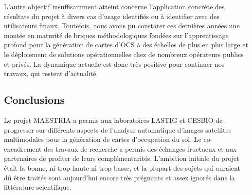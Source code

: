 L’autre objectif insuffisamment atteint concerne l’application concrète des résultats du projet à divers cas d’usage identifiés ou à identifier avec des utilisateurs finaux. Toutefois, nous avons pu constater ces dernières années une montée en maturité de briques méthodologiques fondées sur l'apprentissage profond pour la génération de cartes d'OCS à des échelles de plus en plus large et le déploiement de solutions opérationnelles chez de nombreux opérateurs publics et privés. La dynamique actuelle est donc très positive pour continuer nos travaux, qui restent d'actualité.

\subsection{Conclusions}
Le projet MAESTRIA a permis aux laboratoires LASTIG et CESBIO de progresser sur différents aspects de l'analyse automatique d'images satellites multimodales pour la génération de cartes d'occupation du sol. Le co-encadrement des travaux de recherche a permis des échanges fructueux et aux partenaires de profiter de leurs complémentarités. L'ambition initiale du projet était la bonne, ni trop haute ni trop basse, et la plupart des sujets qui auraient dû être traités sont aujourd'hui encore très prégnants et assez ignorés dans la littérature scientifique.

